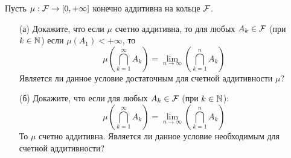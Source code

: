 \begin{task}{1}
	Пусть $\mu : \mathcal{F}  \rightarrow [0, +\infty]$ конечно аддитивна на кольце $\mathcal{F} $.
	\begin{enumerate}
		\item[(а)] Докажите, что если $\mu$ счетно аддитивна, то для любых $A_k \in \mathcal{F} $ (при $k \in \mathbb{N}$) если $\mu(A_1)  < + \infty$, то 
		$$
		\mu\left(\bigcap_{k=1}^{\infty}A_k\right) = \lim\limits_{n \rightarrow \infty} \left(\bigcap_{k=1}^{n}A_k\right)
		$$
		Является ли данное условие достаточным для счетной аддитивности $\mu$?
		\item[(б)] Докажите, что если для любых $A_k \in \mathcal{F} $ (при $k \in \mathbb{N}$):
		$$
		\mu\left(\bigcap_{k=1}^{\infty}A_k\right) = \lim\limits_{n \rightarrow \infty} \left(\bigcap_{k=1}^{n}A_k\right)
		$$
		То $\mu$ счетно аддитивна. \newline
		Является ли данное условие необходимым для счетной аддитивности?
	\end{enumerate}
\end{task}

